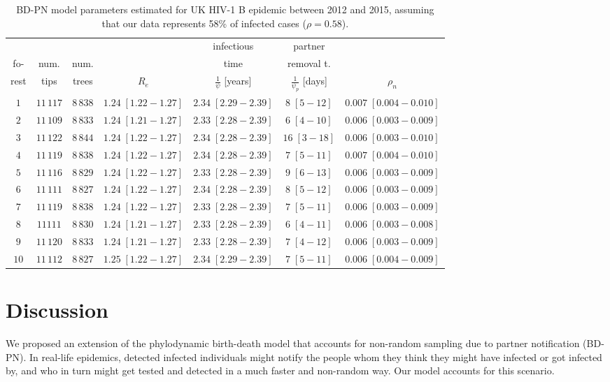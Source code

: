 \documentclass[a4paper,10pt]{article}
\begin{document}
\begin{table}
\caption{BD-PN model parameters estimated for UK HIV-1 B epidemic between 2012 and 2015, assuming that our data represents 58\% of infected cases ($\rho=0.58$).}
\label{tbl:uk}
\begin{tabular}{c|cc|cccc}
&&&&infectious&partner&\\
fo-&num.&num.&&time&removal t.&\\
rest&tips&trees&$R_e$&$\frac{1}{\psi}$ [years]& $\frac{1}{\psi_p}$ [days]&$\rho_n$\\
\toprule
 $1$ & $11\,117$ & $8\,838$& $1.24\;[1.22-1.27]$& $2.34\;[2.29-2.39]$& $8\;[5-12]$& $0.007\;[0.004-0.010]$ \\
 $2$ & $11\,109$ & $8\,833$& $1.24\;[1.21-1.27]$& $2.33\;[2.28-2.39]$& $6\;[4-10]$& $0.006\;[0.003-0.009]$ \\
 $3$ & $11\,122$ & $8\,844$& $1.24\;[1.22-1.27]$& $2.34\;[2.28-2.39]$& $16\;[3-18]$& $0.006\;[0.003-0.010]$ \\
 $4$ & $11\,119$ & $8\,838$& $1.24\;[1.22-1.27]$& $2.34\;[2.28-2.39]$& $7\;[5-11]$& $0.007\;[0.004-0.010]$ \\
 $5$ & $11\,116$ & $8\,829$& $1.24\;[1.22-1.27]$& $2.33\;[2.28-2.39]$& $9\;[6-13]$& $0.006\;[0.003-0.009]$ \\
 $6$ & $11\,111$ & $8\,827$& $1.24\;[1.22-1.27]$& $2.34\;[2.28-2.39]$& $8\;[5-12]$& $0.006\;[0.003-0.009]$ \\
 $7$ & $11\,119$ & $8\,838$& $1.24\;[1.22-1.27]$& $2.33\;[2.28-2.39]$& $7\;[5-11]$& $0.006\;[0.003-0.009]$ \\
 $8$ & $11111$ & $8\,830$& $1.24\;[1.21-1.27]$& $2.33\;[2.28-2.39]$& $6\;[4-11]$& $0.006\;[0.003-0.008]$ \\
 $9$ & $11\,120$ & $8\,833$& $1.24\;[1.21-1.27]$& $2.33\;[2.28-2.39]$& $7\;[4-12]$& $0.006\;[0.003-0.009]$ \\
 $10$ & $11\,112$ & $8\,827$& $1.25\;[1.22-1.27]$& $2.34\;[2.29-2.39]$& $7\;[5-11]$& $0.006\;[0.004-0.009]$ \\
 \bottomrule
 \end{tabular}
 \end{table}



\section{Discussion}
\label{disc}

We proposed an extension of the phylodynamic birth-death model that accounts for non-random sampling due to partner notification (BD-PN). In real-life epidemics, detected infected individuals might notify the people whom they think they might have infected or got infected by, and who in turn might get tested and detected in a much faster and non-random way. Our model accounts for this scenario.
\end{document}

